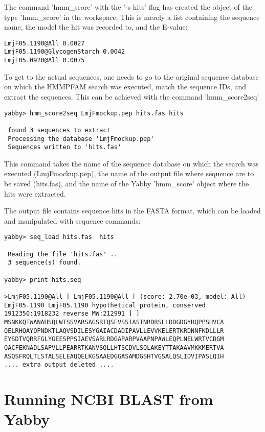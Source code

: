 The command 'hmm\_score' with the '-s hits' flag has created
the object of the type 'hmm\_score' in the workspace. This is
merely a list containing the sequence name, the model the
hit was recorded to, and the E-value:

\begin{verbatim}
LmjF05.1190@All 0.0027
LmjF05.1190@GlycogenStarch 0.0042
LmjF05.0920@All 0.0075
\end{verbatim}

To get to the actual sequences, one needs to go to the
original sequence database on which the HMMPFAM search
was executed, match the sequence IDs, and extract the
sequences. This can be achieved with the command
'hmm\_score2seq'

\begin{verbatim}
yabby> hmm_score2seq LmjFmockup.pep hits.fas hits

 found 3 sequences to extract
 Processing the database 'LmjFmockup.pep'
 Sequences written to 'hits.fas'
\end{verbatim}

This command takes the name of the sequence database on
which the search was executed (LmjFmockup.pep), the name
of the output file where sequence are to be saved (hits.fas),
and the name of the Yabby 'hmm\_score' object where the
hits were extracted.

The output file contains sequence hits in the FASTA format,
which can be loaded and manipulated with sequence commands: 

\begin{verbatim}
yabby> seq_load hits.fas  hits

 Reading the file 'hits.fas' ..
 3 sequence(s) found.

yabby> print hits.seq

>LmjF05.1190@All [ LmjF05.1190@All [ (score: 2.70e-03, model: All) LmjF05.1190 LmjF05.1190 hypothetical protein, conserved 1912350:1918232 reverse MW:212991 ] ]
MSNKKQTWANAHSQLWTSSVARSAGSRTQSEVSSIASTNRDRSLLDDGDGYHQPPSHVCA
QELRHQAYQPNDKTLAQVSDILESYGAIACDADIPAVLLEVVKELERTKRDNNFKDLLLR
EYSDTVQRRFGLYGEESPPSIAEVSARLRDGAPARPVAAPNPAWLEQPLNELWRTVCDGM
QACFEKNADLSAPVLLPEARRTKANVSQLLHTSCDVLSQLAKEYTTAKAAVMKKMERTVA
ASQSFRQLTLSTALSELEAQQELKGSAAEDGGASAMDGSHTVGSALQSLIDVIPASLQIH
.... extra output deleted ....
\end{verbatim}


\section{Running NCBI BLAST from Yabby}

